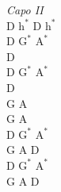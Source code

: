 \begin{chord}
    \textit{Capo II}\\
    D $\mathrm{h^{*}}$ D $\mathrm{h^{*}}$\\
    D $\mathrm{G^{*}}$ $\mathrm{A^{*}}$\\
    D\\
    D $\mathrm{G^{*}}$ $\mathrm{A^{*}}$\\
    D\\
    G A\\
    G A\\
    D $\mathrm{G^{*}}$ $\mathrm{A^{*}}$\\
    G A D\\
    D $\mathrm{G^{*}}$ $\mathrm{A^{*}}$\\
    G A D

\end{chord}
